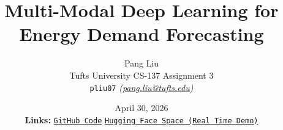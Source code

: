 \usepackage{enumitem}

\newcommand{\eg}{\textit{e.g.}}
\newcommand{\ie}{\textit{i.e.}}
\newcommand{\nz}{n_{z}}
\newcommand{\highlight}[1]{\textbf{\color{NavyAccent}#1}}
\newcommand{\zone}[1]{\texttt{#1}}

\title{\vspace{-1.5em}
  \textbf{\color{NavyAccent} Multi-Modal Deep Learning for Energy Demand Forecasting}
}
\author{
  Pang Liu \\
  \small Tufts University \;\textbf{\color{NavyAccent}\textperiodcentered}\; CS-137 Assignment 3 \\
  \small \texttt{pliu07} \;\;\;\textit{(\href{mailto:pang.liu@tufts.edu}{pang.liu@tufts.edu})}
}
\date{
  April 30, 2026
  \\[0.5em]
  \normalsize\textbf{\color{NavyAccent} Links:}\;
  \href{https://github.com/jeffliulab/real-time-power-predict}{\texttt{GitHub Code}}
  \;\textbf{\color{NavyAccent}\textperiodcentered}\;
  \href{https://huggingface.co/spaces/jeffliulab/predict-power}{\texttt{Hugging Face Space (Real Time Demo)}}
}
